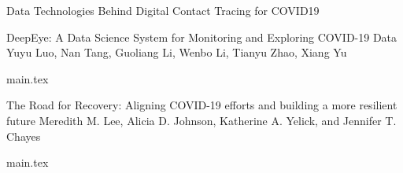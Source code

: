 \documentclass[11pt]{article}
\begin{document}
\begin{bulletin}
\begin{articlesection}{Data Technologies Behind Digital Contact Tracing for COVID19}
\makeatletter
\renewcommand{\AB@affillist}{}
\renewcommand{\AB@authlist}{}
\setcounter{authors}{0}
\makeatother



\begin{article}
{DeepEye: A Data Science System for Monitoring and Exploring COVID-19 Data}
{Yuyu Luo, Nan Tang, Guoliang Li, Wenbo Li, Tianyu Zhao, Xiang Yu}
\graphicspath{{submissions/deepeye}}
{main.tex}
\end{article}



\makeatletter
\renewcommand{\AB@affillist}{}
\renewcommand{\AB@authlist}{}
\setcounter{authors}{0}
\makeatother


\begin{article}
{The Road for Recovery: 
Aligning COVID-19 efforts and building a more resilient future}
{Meredith M. Lee, Alicia D. Johnson, Katherine A. Yelick, and Jennifer T. Chayes}
\graphicspath{{submissions/OpEd_June2020_IEEEDataEng/figs/}}
{main.tex}
\end{article}



\makeatletter
\renewcommand{\AB@affillist}{}
\renewcommand{\AB@authlist}{}
\setcounter{authors}{0}
\makeatother


\end{articlesection}




%
%





\begin{callsection}


\end{callsection}
\end{bulletin}
\end{document}
